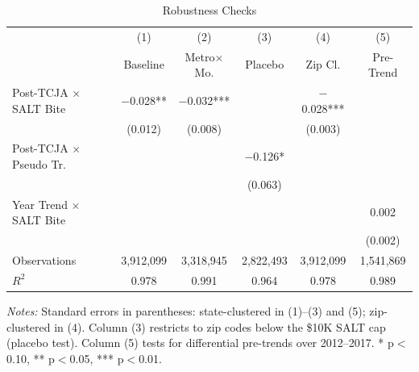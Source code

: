 \begin{table}[H]
\centering
\caption{Robustness Checks}
\label{tab:robustness}
\begin{threeparttable}
\begin{tabular}{@{}lccccc@{}}
\toprule
 & (1) & (2) & (3) & (4) & (5) \\
 & Baseline & Metro$\times$Mo. & Placebo & Zip Cl. & Pre-Trend \\
\midrule
Post-TCJA $\times$ SALT Bite & $-$0.028** & $-$0.032*** & & $-$0.028*** & \\
 & (0.012) & (0.008) & & (0.003) & \\[4pt]
Post-TCJA $\times$ Pseudo Tr. & & & $-$0.126* & & \\
 & & & (0.063) & & \\[4pt]
Year Trend $\times$ SALT Bite & & & & & 0.002 \\
 & & & & & (0.002) \\
\midrule
Observations & 3,912,099 & 3,318,945 & 2,822,493 & 3,912,099 & 1,541,869 \\
$R^2$ & 0.978 & 0.991 & 0.964 & 0.978 & 0.989 \\
\bottomrule
\end{tabular}
\begin{tablenotes}[flushleft]
\small
\item \textit{Notes:} Standard errors in parentheses: state-clustered in (1)--(3) and (5); zip-clustered in (4). Column (3) restricts to zip codes below the \$10K SALT cap (placebo test). Column (5) tests for differential pre-trends over 2012--2017. * p$<$0.10, ** p$<$0.05, *** p$<$0.01.
\end{tablenotes}
\end{threeparttable}
\end{table}
